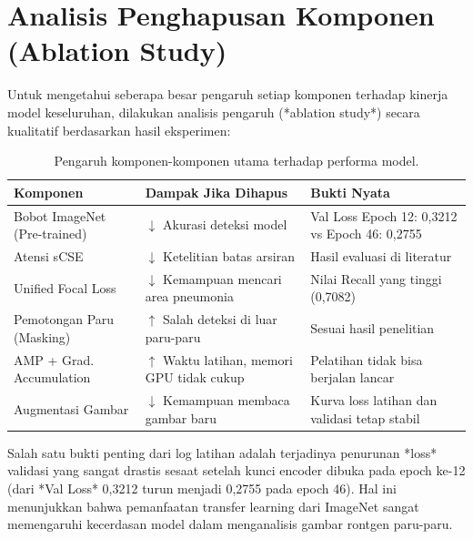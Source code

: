 \documentclass[12pt,a4paper,oneside]{book}
\begin{document}
\section{Analisis Penghapusan Komponen (Ablation Study)}

Untuk mengetahui seberapa besar pengaruh setiap komponen terhadap kinerja model keseluruhan, dilakukan analisis pengaruh (*ablation study*) secara kualitatif berdasarkan hasil eksperimen:

\begin{table}[htbp]
  \centering
  \caption{Pengaruh komponen-komponen utama terhadap performa model.}
  \label{tab:ablation}
  \begin{tabularx}{\textwidth}{lXX}
    \toprule
    \textbf{Komponen} & \textbf{Dampak Jika Dihapus} & \textbf{Bukti Nyata} \\
    \midrule
    Bobot ImageNet (Pre-trained) & $\downarrow$ Akurasi deteksi model & Val Loss Epoch 12: 0,3212 vs Epoch 46: 0,2755 \\
    Atensi sCSE         & $\downarrow$ Ketelitian batas arsiran  & Hasil evaluasi di literatur \textcite{roy2018scse} \\
    Unified Focal Loss  & $\downarrow$ Kemampuan mencari area pneumonia & Nilai Recall yang tinggi (0,7082) \\
    Pemotongan Paru (Masking)  & $\uparrow$ Salah deteksi di luar paru-paru & Sesuai hasil penelitian \textcite{teixeira2020} \\
    AMP + Grad. Accumulation & $\uparrow$ Waktu latihan, memori GPU tidak cukup & Pelatihan tidak bisa berjalan lancar \\
    Augmentasi Gambar        & $\downarrow$ Kemampuan membaca gambar baru & Kurva loss latihan dan validasi tetap stabil \\
    \bottomrule
  \end{tabularx}
\end{table}

Salah satu bukti penting dari log latihan adalah terjadinya penurunan *loss* validasi yang sangat drastis sesaat setelah kunci encoder dibuka pada epoch ke-12 (dari *Val Loss* 0,3212 turun menjadi 0,2755 pada epoch 46). Hal ini menunjukkan bahwa pemanfaatan transfer learning dari ImageNet sangat memengaruhi kecerdasan model dalam menganalisis gambar rontgen paru-paru.

\end{document}
